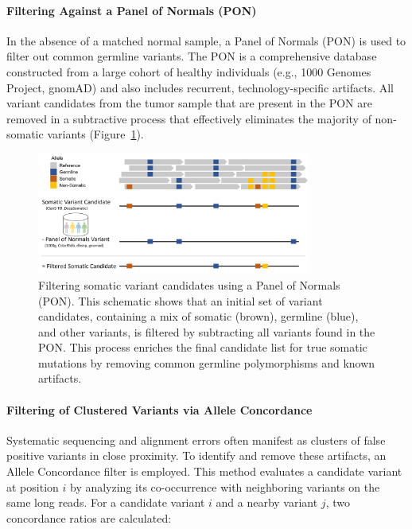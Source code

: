 \documentclass[pdflatex,sn-nature]{sn-jnl}
\def\pandocbounded#1{%
  \begingroup
  \setkeys{Gin}{width=1.0\linewidth,height=1.0\textheight,keepaspectratio}%
  #1%
  \endgroup
}
\begin{document}
\paragraph{Filtering Against a Panel of Normals (PON)}\label{filtering-against-a-panel-of-normals-pon}

In the absence of a matched normal sample, a Panel of Normals (PON) is used to filter out common germline variants. The PON is a comprehensive database constructed from a large cohort of healthy individuals (e.g., 1000 Genomes Project, gnomAD) and also includes recurrent, technology-specific artifacts. All variant candidates from the tumor sample that are present in the PON are removed in a subtractive process that effectively eliminates the majority of non-somatic variants (Figure~\ref{fig:met-page-18-cropped-jpg}).

\begin{figure}
\centering
\pandocbounded{\includegraphics[width=0.8\textwidth,keepaspectratio]{page_18_cropped.jpg}}
\caption[Panel of Normals Filtering]{Filtering somatic variant candidates using a Panel of Normals (PON). This schematic shows that an initial set of variant candidates, containing a mix of somatic (brown), germline (blue), and other variants, is filtered by subtracting all variants found in the PON. This process enriches the final candidate list for true somatic mutations by removing common germline polymorphisms and known artifacts.}\label{fig:met-page-18-cropped-jpg}
\end{figure}

\paragraph{Filtering of Clustered Variants via Allele Concordance}\label{filtering-of-clustered-variants-via-allele-concordance}

Systematic sequencing and alignment errors often manifest as clusters of false positive variants in close proximity. To identify and remove these artifacts, an Allele Concordance filter is employed. This method evaluates a candidate variant at position $i$ by analyzing its co-occurrence with neighboring variants on the same long reads. For a candidate variant $i$ and a nearby variant $j$, two concordance ratios are calculated:
\end{document}
